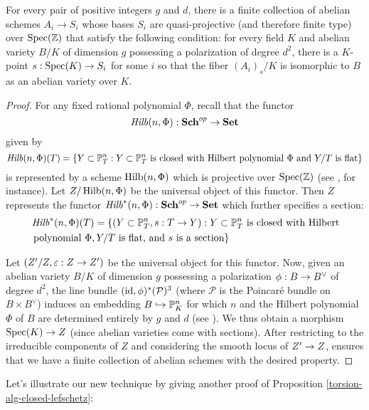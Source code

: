 \begin{lemma}
\label{comprehensive-family}
For every pair of positive integers $g$ and $d$, there is a finite collection of abelian schemes $A_i\rightarrow S_i$ whose bases $S_i$ are quasi-projective (and therefore finite type) over $\operatorname{Spec}(\mathbb{Z})$ that satisfy the following condition: for every field $K$ and abelian variety $B/K$ of dimension $g$ possessing a polarization of degree $d^2$, there is a $K$-point $s:\operatorname{Spec}(K)\rightarrow S_i$ for some $i$ so that the fiber $(A_i)_s/K$ is isomorphic to $B$ as an abelian variety over $K$.
\end{lemma}
\begin{proof} For any fixed rational polynomial $\Phi$, recall that the functor $$\operatorname{\mathit{Hilb}}(n,\Phi):{\normalfont\textbf{Sch}}^{op}\rightarrow {\normalfont\textbf{Set}}$$ given by 
$$\operatorname{\mathit{Hilb}}(n,\Phi)(T)=\{Y\subset \mathbb{P}^n_T: Y\subset \mathbb{P}^n_T\text { is closed with Hilbert polynomial } \Phi\\ \text{ and }Y/T\text{ is flat}\}$$ is represented by a scheme $\operatorname{Hilb}(n,\Phi)$ which is projective over $\operatorname{Spec}(\mathbb{Z})$ (see \cite{FGAHilbert}, for instance). Let $Z/\operatorname{Hilb}(n,\Phi)$ be the universal object of this functor. Then $Z$ represents the functor $\operatorname{\mathit{Hilb}}^*(n,\Phi):{\normalfont\textbf{Sch}}^{op}\rightarrow {\normalfont\textbf{Set}}$ which further specifies a section:
\begin{align*}
&\operatorname{\mathit{Hilb}}^*(n,\Phi)(T)=\{(Y\subset \mathbb{P}^n_T, s: T\rightarrow Y) : Y\subset \mathbb{P}^n_T\text { is closed with Hilbert} \\&\text{ polynomial } \Phi,Y/T\text{ is flat, and } s\text{ is a section}\}
\end{align*}

\noindent Let $(Z'/Z, \varepsilon: Z\rightarrow Z')$ be the universal object for this functor. Now, given an abelian variety $B/K$ of dimension $g$ possessing a polarization $\phi:B\rightarrow B^{\vee}$ of degree $d^2$, the line bundle $(\operatorname{id},\phi)^*(\mathcal{P})^3$ (where $\mathcal{P}$ is the Poincar\'e bundle on $B\times B^{\vee}$) induces an embedding $B\hookrightarrow \mathbb{P}^n_K$ for which $n$ and the Hilbert polynomial $\Phi$ of $B$ are determined entirely by $g$ and $d$ (see \cite[Ch. 3, sec. 16]{mumfordAV}). We thus obtain a morphism $\operatorname{Spec}(K)\rightarrow Z$ (since abelian varieties come with sections). After restricting to the irreducible components of $Z$ and considering the smooth locus of $Z'\rightarrow Z$, \cite[Theorem 6.14]{GIT} ensures that we have a finite collection of abelian schemes with the desired property.
\end{proof}

Let's illustrate our new technique by giving another proof of Proposition \ref{torsion-alg-closed-lefschetz}:

